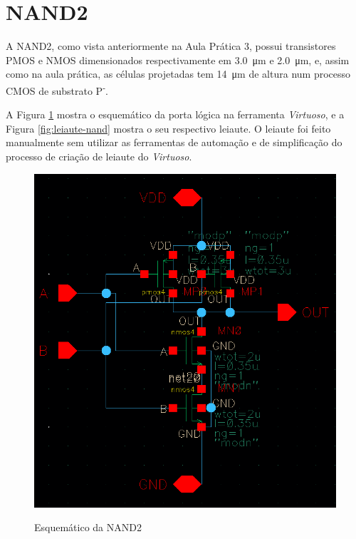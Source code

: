 \documentclass{iiufrgs}
\newcommand{\virtuoso}{\textit{Virtuoso}}
\begin{document}
\section{NAND2}\label{nand}
A NAND2, como vista anteriormente na Aula Prática 3, possui transistores PMOS e NMOS dimensionados respectivamente em \SI{3.0}{\um} e \SI{2.0}{\um}, e, assim como na aula prática, as células projetadas tem \SI{14}{\um} de altura num processo CMOS de substrato P\textsuperscript{-}.

A Figura \ref{fig:esquematico-nand} mostra o esquemático da porta lógica na ferramenta \virtuoso, e a Figura \ref{fig:leiaute-nand} mostra o seu respectivo leiaute. O leiaute foi feito manualmente sem utilizar as ferramentas de automação e de simplificação do processo de criação de leiaute do \virtuoso.

\begin{figure}[htbp]
    \centering
    \caption{Esquemático da NAND2}
    \includegraphics[scale=0.8]{images/schem_nand.png}
    \label{fig:esquematico-nand}
\end{figure}
\end{document}
